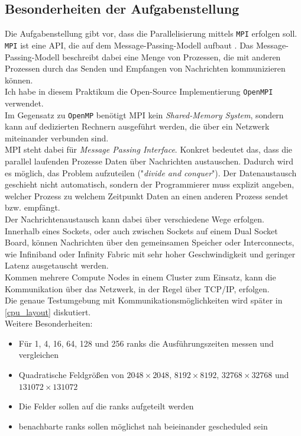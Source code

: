 \documentclass[german,plainarticle,hyperref,utf8]{zihpub}
\begin{document}
	\subsection{Besonderheiten der Aufgabenstellung}
	Die Aufgabenstellung gibt vor, dass die Parallelisierung mittels \texttt{MPI} erfolgen soll. \texttt{MPI} ist eine API, die auf dem Message-Passing-Modell aufbaut \cite{mpi}. Das Message-Passing-Modell beschreibt dabei eine Menge von Prozessen, die mit anderen Prozessen durch das Senden und Empfangen von Nachrichten kommunizieren können.\\
	Ich habe in diesem Praktikum die Open-Source Implementierung \texttt{OpenMPI} verwendet.\\
	Im Gegensatz zu \texttt{OpenMP} benötigt MPI kein \textit{Shared-Memory System}, sondern kann auf dedizierten Rechnern ausgeführt werden, die über ein Netzwerk miteinander verbunden sind.\\
	
	MPI steht dabei für \textit{Message Passing Interface}. Konkret bedeutet das, dass die parallel laufenden Prozesse Daten über Nachrichten austauschen. Dadurch wird es möglich, das Problem aufzuteilen ("\textit{divide and conquer}"). Der Datenaustausch geschieht nicht automatisch, sondern der Programmierer muss explizit angeben, welcher Prozess zu welchem Zeitpunkt Daten an einen anderen Prozess sendet bzw. empfängt.\\
	
	Der Nachrichtenaustausch kann dabei über verschiedene Wege erfolgen.\\
	Innerhalb eines Sockets, oder auch zwischen Sockets auf einem Dual Socket Board, können Nachrichten über den gemeinsamen Speicher oder Interconnects, wie Infiniband oder Infinity Fabric mit sehr hoher Geschwindigkeit und geringer Latenz ausgetauscht werden.\\
	Kommen mehrere Compute Nodes in einem Cluster zum Einsatz, kann die Kommunikation über das Netzwerk, in der Regel über TCP/IP, erfolgen.\\
	Die genaue Testumgebung mit Kommunikationsmöglichkeiten wird später in \ref{cpu_layout} diskutiert.\\
	
	Weitere Besonderheiten:
	\begin{itemize}
		\item Für 1, 4, 16, 64, 128 und 256 ranks die Ausführungszeiten messen und vergleichen
		\item Quadratische Feldgrößen von $2048\times 2048$, $8192\times 8192$, $32768\times 32768$ und $131072\times 131072$
		\item Die Felder sollen auf die ranks aufgeteilt werden
		\item benachbarte ranks sollen möglichst nah beieinander gescheduled sein
	\end{itemize}
\end{document}
